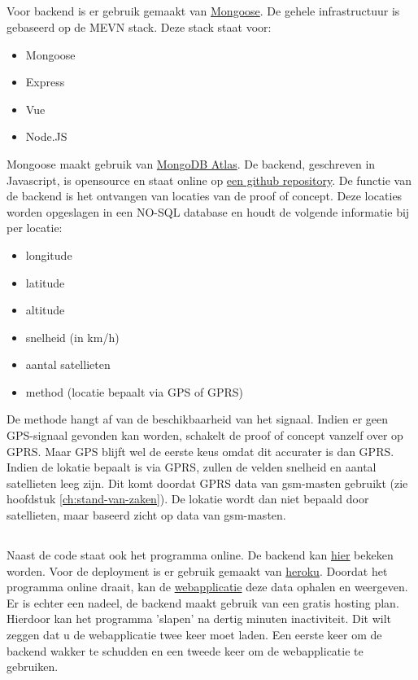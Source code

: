 \subsection{}
Voor backend is er gebruik gemaakt van \href{https://mongoosejs.com/}{Mongoose}. De gehele infrastructuur is gebaseerd op de MEVN stack.
Deze stack staat voor:
\begin{itemize}
	\item Mongoose
	\item Express
	\item Vue
	\item Node.JS
\end{itemize}
Mongoose maakt gebruik van \href{https://www.mongodb.com/cloud/atlas}{MongoDB Atlas}. De backend, geschreven in Javascript, is opensource en staat online op \href{https://github.com/IndyVC/bap-backend}{een github repository}.
\newline
De functie van de backend is het ontvangen van locaties van de proof of concept. Deze locaties worden opgeslagen in een NO-SQL database en houdt de volgende informatie bij per locatie:
\begin{itemize}
	\item longitude
	\item latitude
	\item altitude
	\item snelheid (in km/h)
	\item aantal satellieten
	\item method (locatie bepaalt via GPS of GPRS)
\end{itemize}
De methode hangt af van de beschikbaarheid van het signaal. Indien er geen GPS-signaal gevonden kan worden, schakelt de proof of concept vanzelf over op GPRS. Maar GPS blijft wel de eerste keus omdat dit accurater is dan GPRS. Indien de lokatie bepaalt is via GPRS, zullen de velden snelheid en aantal satellieten leeg zijn. Dit komt doordat GPRS data van gsm-masten gebruikt (zie hoofdstuk \ref{ch:stand-van-zaken}). De lokatie wordt dan niet bepaald door satellieten, maar baseerd zicht op data van gsm-masten. 

\subsection{}
Naast de code staat ook het programma online. De backend kan \href{https://indy-bap-backend.herokuapp.com/api/locations}{\underline{hier}} bekeken worden. Voor de deployment is er gebruik gemaakt van \href{www.heroku.com}{heroku}. Doordat het programma online draait, kan de \href{https://indy-bap-frontend.netlify.com/}{webapplicatie} deze data ophalen en weergeven.
\newline
Er is echter een nadeel, de backend maakt gebruik van een gratis hosting plan. Hierdoor kan het programma 'slapen' na dertig minuten inactiviteit. Dit wilt zeggen dat u de webapplicatie twee keer moet laden. Een eerste keer om de backend wakker te schudden en een tweede keer om de webapplicatie te gebruiken.
\pagebreak
